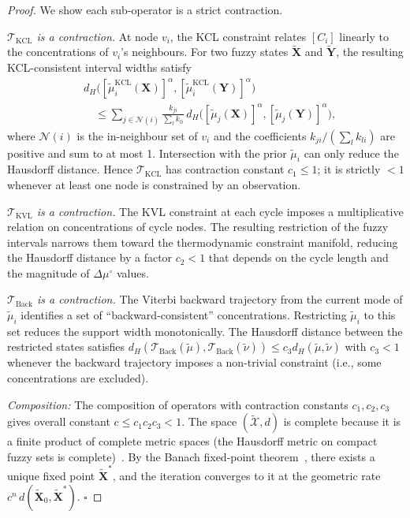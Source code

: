 \documentclass[twocolumn,10pt,a4paper]{article}
\begin{document}
\begin{proof}
We show each sub-operator is a strict contraction.

\emph{$\mathcal{T}_{\mathrm{KCL}}$ is a contraction.}
At node $v_i$, the KCL constraint relates $[C_i]$ linearly to the
concentrations of $v_i$'s neighbours.  For two fuzzy states
$\widetilde{\mathbf{X}}$ and $\widetilde{\mathbf{Y}}$, the resulting
KCL-consistent interval widths satisfy
\begin{align*}
  &d_H\bigl([\tilde{\mu}_i^{\mathrm{KCL}}(\mathbf{X})]^\alpha,
            [\tilde{\mu}_i^{\mathrm{KCL}}(\mathbf{Y})]^\alpha\bigr)\\
  &\quad\leq \sum_{j\in\mathcal{N}(i)}\frac{k_{ji}}{\sum_l k_{li}}\,
    d_H\bigl([\tilde{\mu}_j(\mathbf{X})]^\alpha,[\tilde{\mu}_j(\mathbf{Y})]^\alpha\bigr),
\end{align*}
where $\mathcal{N}(i)$ is the in-neighbour set of $v_i$ and the coefficients
$k_{ji}/(\sum_l k_{li})$ are positive and sum to at most 1.  Intersection with
the prior $\tilde{\mu}_i$ can only reduce the Hausdorff distance.  Hence
$\mathcal{T}_{\mathrm{KCL}}$ has contraction constant $c_1\leq 1$; it is
strictly $<1$ whenever at least one node is constrained by an observation.

\emph{$\mathcal{T}_{\mathrm{KVL}}$ is a contraction.}
The KVL constraint at each cycle imposes a multiplicative relation on
concentrations of cycle nodes.  The resulting restriction of the fuzzy
intervals narrows them toward the thermodynamic constraint manifold, reducing
the Hausdorff distance by a factor $c_2<1$ that depends on the cycle length
and the magnitude of $\Delta\mu^\circ$ values.

\emph{$\mathcal{T}_{\mathrm{Back}}$ is a contraction.}
The Viterbi backward trajectory from the current mode of $\tilde{\mu}_i$
identifies a set of ``backward-consistent'' concentrations.  Restricting
$\tilde{\mu}_i$ to this set reduces the support width monotonically.  The
Hausdorff distance between the restricted states satisfies
$d_H(\mathcal{T}_{\mathrm{Back}}(\tilde{\mu}),
\mathcal{T}_{\mathrm{Back}}(\tilde{\nu}))\leq c_3 d_H(\tilde{\mu},\tilde{\nu})$
with $c_3<1$ whenever the backward trajectory imposes a non-trivial constraint
(i.e., some concentrations are excluded).

\emph{Composition:} The composition of operators with contraction constants
$c_1,c_2,c_3$ gives overall constant $c\leq c_1 c_2 c_3<1$.  The space
$(\widetilde{\mathcal{X}},d)$ is complete because it is a finite product of
complete metric spaces (the Hausdorff metric on compact fuzzy sets is
complete)~\cite{Hausdorff1914}.  By the Banach fixed-point
theorem~\cite{Banach1922}, there exists a unique fixed point
$\widetilde{\mathbf{X}}^*$, and the iteration converges to it at the geometric
rate $c^n\,d(\widetilde{\mathbf{X}}_0,\widetilde{\mathbf{X}}^*)$.  $\square$
\end{proof}
\end{document}
